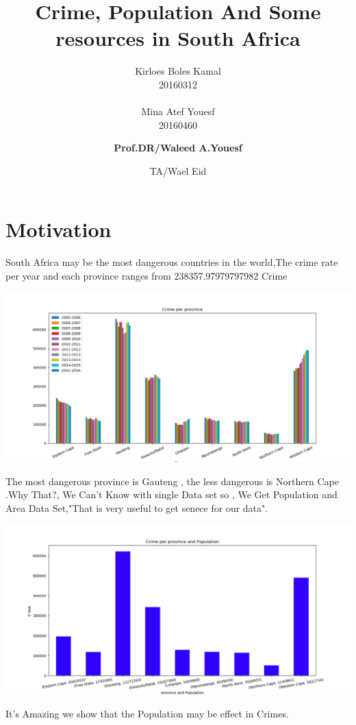\documentclass[landscape,17pt]{extarticle}
\title{\textbf{Crime, Population And Some resources in South Africa}}
\author{Kirloes Boles Kamal\\ 20160312\\\\Mina Atef Youesf\\20160460 \and \textbf{Prof.DR/Waleed A.Youesf} \and TA/Wael Eid}
\begin{document}
\maketitle
\newpage
{}

\tableofcontents
\newpage
\section{Motivation}
South Africa may be the most dangerous countries in the world,The crime rate per year and each province ranges from 238357.97979797982 Crime \\
\begin{flushleft}

\includegraphics[width=1.2\textwidth,height=.7\textheight]{Images/Figure_1.png}
\end{flushleft}
\newpage
The most dangerous province is Gauteng , the less dangerous is Northern Cape .Why That?, We Can't Know with single Data set so , We Get Population and Area Data Set,"That is very useful to get senece for our data".
\begin{flushleft}
\includegraphics[width=1.2\textwidth]{Images/Figure_2.png}
\end{flushleft}
It's Amazing we show that the Population may be effect in Crimes.
\end{document}
